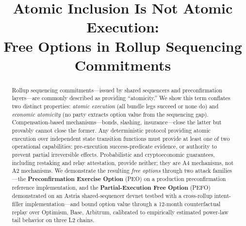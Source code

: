 \documentclass[conference]{IEEEtran}
\newcommand{\PEO}{\textsf{PEO}}
\newcommand{\PEFO}{\textsf{PEFO}}
\begin{document}
\title{Atomic Inclusion Is Not Atomic Execution:\\
Free Options in Rollup Sequencing Commitments}

\maketitle

\begin{abstract}
Rollup sequencing commitments---issued by shared sequencers and
preconfirmation layers---are commonly described as providing ``atomicity.''
We show this term conflates two distinct properties: \emph{atomic execution}
(all bundle legs succeed or none do) and \emph{economic atomicity} (no party
extracts option value from the sequencing gap). Compensation-based
mechanisms---bonds, slashing, insurance---close the latter but provably
cannot close the former. Any deterministic protocol providing atomic execution
over independent state transition functions must provide at least one of two
operational capabilities: pre-execution success-predicate evidence, or
authority to prevent partial irreversible effects. Probabilistic and
cryptoeconomic guarantees, including restaking and relay attestation, provide
neither; they are A4 mechanisms, not A2 mechanisms. We demonstrate the
resulting \emph{free options} through two attack families---the
\textbf{Preconfirmation Exercise Option} (\PEO{}) on a production
preconfirmation reference implementation, and the \textbf{Partial-Execution
Free Option} (\PEFO{}) demonstrated on an Astria shared-sequencer devnet
testbed with a cross-rollup intent-filler implementation---and bound option
value through a 12-month counterfactual replay over Optimism, Base, Arbitrum,
calibrated to empirically estimated power-law tail behavior on three L2 chains.
\end{abstract}















\appendix

\end{document}
